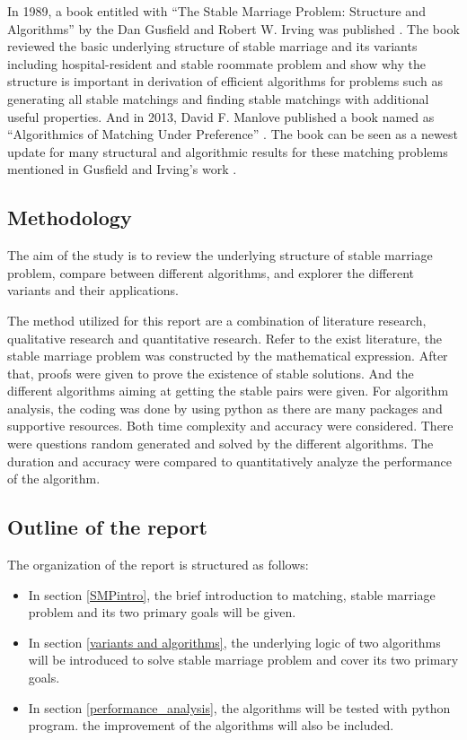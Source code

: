 \documentclass[14pt]{extarticle}
\begin{document}
In 1989, a book entitled with “The Stable Marriage Problem: Structure and Algorithms” by the Dan Gusfield and Robert W. Irving was published \cite{Gusfield1989}. 
The book reviewed the basic underlying structure of stable marriage and its variants including hospital-resident and stable roommate problem and show why the structure is important in derivation of efficient algorithms for problems such as generating all stable matchings and finding stable matchings with additional useful properties.
And in 2013, David F. Manlove published a book named as “Algorithmics of Matching Under Preference” \cite{manlove2013}. The book can be seen as a newest update for many structural and algorithmic results for these matching problems mentioned in Gusfield and Irving’s work \cite{Gusfield1989}.

\subsection{Methodology}
The aim of the study is to review the underlying structure of stable marriage problem, 
compare between different algorithms, and explorer the different variants and their applications. 

The method utilized for this report are a combination of literature research, qualitative research and quantitative research. 
Refer to the exist literature, the stable marriage problem was constructed by the mathematical expression. 
After that, proofs were given to prove the existence of stable solutions. 
And the different algorithms aiming at getting the stable pairs were given. 
For algorithm analysis, the coding was done by using python as there are many packages and supportive resources.
Both time complexity and accuracy were considered. 
There were questions random generated and solved by the different algorithms. 
The duration and accuracy were compared to quantitatively analyze the performance of the algorithm.

\subsection{Outline of the report}
The organization of the report is structured as follows: 
\begin{itemize}
  \item In section \ref{SMPintro}, the brief introduction to matching, stable marriage problem and its two primary goals will be given.
  \item In section \ref{variants and algorithms}, the underlying logic of two algorithms will be introduced to solve stable marriage problem and cover its two primary goals.
  \item In section \ref{performance_analysis}, the algorithms will be tested with python program. the improvement of the algorithms will also be included.
\end{itemize}
\end{document}
